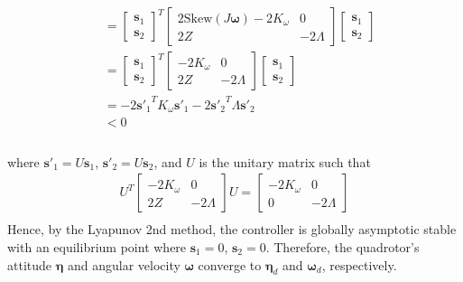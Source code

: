 \begin{equation}
\begin{aligned}
& =
\begin{bmatrix}
{\boldsymbol s}_1 \\
{\boldsymbol s}_2
\end{bmatrix} ^{T}
\begin{bmatrix}
2 {\text {Skew}}(J {\boldsymbol \omega}) - 2K_{\omega} & 0 \\
2Z &  -2 \Lambda
\end{bmatrix}
\begin{bmatrix}
{\boldsymbol s}_1 \\
{\boldsymbol s}_2
\end{bmatrix}\\
& = 
\begin{bmatrix}
{\boldsymbol s}_1 \\
{\boldsymbol s}_2
\end{bmatrix} ^{T}
\begin{bmatrix}
- 2K_{\omega} & 0 \\
2Z &  -2 \Lambda
\end{bmatrix}
\begin{bmatrix}
{\boldsymbol s}_1 \\
{\boldsymbol s}_2
\end{bmatrix}\\
& =  - 2 {{\boldsymbol{s}'}_1}^{T} K_{\omega} {\boldsymbol{s}'}_1 - 2 {{\boldsymbol{s}'}_2}^{T} \Lambda {\boldsymbol{s}'}_2\\
& < 0 \\
\end{aligned}
\end{equation} \\
where \({\boldsymbol s'}_1 = U {\boldsymbol s}_1 \), \({\boldsymbol s'}_2 = U {\boldsymbol s}_2 \), and \(U\) is the unitary matrix such that
\begin{equation}
\begin{aligned}
U^{T}
\begin{bmatrix}
- 2K_{\omega} & 0 \\
2Z &  -2 \Lambda
\end{bmatrix}
U
=
\begin{bmatrix}
- 2K_{\omega} & 0 \\
0 &  -2 \Lambda
\end{bmatrix}\\
\end{aligned}
\end{equation}
\color{black} %
Hence, by the Lyapunov 2nd method, the controller is globally asymptotic stable with an equilibrium point where \( {\boldsymbol s_1} =  0\), \( {\boldsymbol s_2} =  0\). Therefore, the quadrotor's attitude \({\boldsymbol \eta}\) and angular velocity \({\boldsymbol \omega}\) converge to \({\boldsymbol \eta}_d\) and \({\boldsymbol \omega}_d \), respectively.

